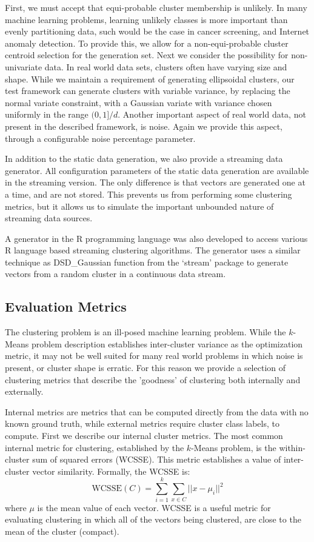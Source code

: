 First, we must accept that equi-probable cluster membership is unlikely.  In many machine learning
problems, learning unlikely classes is more important than evenly partitioning data, such would be
the case in cancer screening, and Internet anomaly detection.  To provide this, we allow for a
non-equi-probable cluster centroid selection for the generation set.  Next we consider the
possibility for non-univariate data.  In real world data sets, clusters often have varying size and
shape.  While we maintain a requirement of generating ellipsoidal clusters, our test framework can
generate clusters with variable variance, by replacing the normal variate constraint, with a
Gaussian variate with variance chosen uniformly in the range $(0,1]/d$.  Another important aspect
  of real world data, not present in the described framework, is noise.  Again we provide this
  aspect, through a configurable noise percentage parameter.

In addition to the static data generation, we also provide a streaming data generator.  All
configuration parameters of the static data generation are available in the streaming version.  The
only difference is that vectors are generated one at a time, and are not stored.  This prevents us
from performing some clustering metrics, but it allows us to simulate the important unbounded nature
of streaming data sources.

A generator in the R programming language was also developed to access various R language based
streaming clustering algorithms.  The generator uses a similar technique as \textsf{DSD\_Gaussian}
function from the `stream' package to generate vectors from a random cluster in a continuous data
stream.

\subsection{Evaluation Metrics}\label{evalmetrics}

The clustering problem is an ill-posed machine learning problem.  While the $k$-Means problem
description establishes inter-cluster variance as the optimization metric, it may not be well suited
for many real world problems in which noise is present, or cluster shape is erratic.  For this reason
we provide a selection of clustering metrics that describe the 'goodness' of clustering both
internally and externally.

Internal metrics are metrics that can be computed directly from the data with no known ground truth,
while external metrics require cluster class labels, to compute. First we describe our internal cluster
metrics.  The most common internal metric for clustering,
established by the $k$-Means problem, is the within-cluster sum of squared errors (WCSSE).  This
metric establishes a value of inter-cluster vector similarity.  Formally, the WCSSE is:
$$
\text{WCSSE}(C) = {\overset{k}{\underset{i=1}{\sum}}} {\underset{x\in C}{\sum}}
||x-\mu_i||^2
$$
where $\mu$ is the mean value of each vector.  WCSSE is a useful metric for evaluating clustering
in which all of the vectors being clustered, are close to the mean of the cluster (compact).

